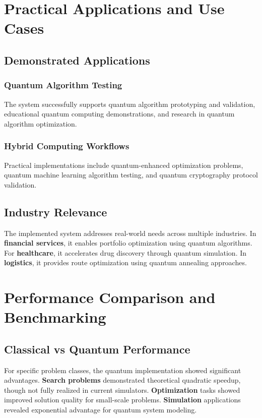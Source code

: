 \documentclass[onecolumn]{IEEEtran}
\begin{document}
\section{Practical Applications and Use Cases}

\subsection{Demonstrated Applications}

\subsubsection{Quantum Algorithm Testing}
The system successfully supports quantum algorithm prototyping and validation, educational quantum computing demonstrations, and research in quantum algorithm optimization.

\subsubsection{Hybrid Computing Workflows}
Practical implementations include quantum-enhanced optimization problems, quantum machine learning algorithm testing, and quantum cryptography protocol validation.

\subsection{Industry Relevance}

The implemented system addresses real-world needs across multiple industries. In \textbf{financial services}, it enables portfolio optimization using quantum algorithms. For \textbf{healthcare}, it accelerates drug discovery through quantum simulation. In \textbf{logistics}, it provides route optimization using quantum annealing approaches.

\section{Performance Comparison and Benchmarking}

\subsection{Classical vs Quantum Performance}

For specific problem classes, the quantum implementation showed significant advantages. \textbf{Search problems} demonstrated theoretical quadratic speedup, though not fully realized in current simulators. \textbf{Optimization} tasks showed improved solution quality for small-scale problems. \textbf{Simulation} applications revealed exponential advantage for quantum system modeling.
\end{document}
